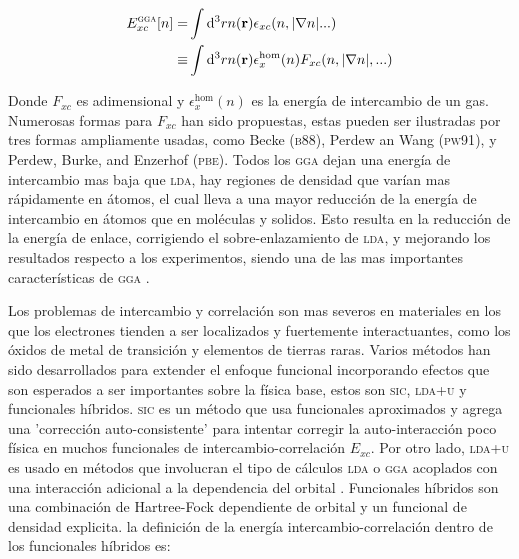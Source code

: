 \begin{equation}
    \begin{split}
        E_{xc}^{\textsc{gga}}[n]=&\int\mathrm{d}^{3}rn(\vec{r})\epsilon_{xc}(n,|\nabla n|...)\\
        \equiv&\int\mathrm{d}^{3}rn(\vec{r})\epsilon_{x}^\text{hom}(n)F_{xc}(n,|\nabla n|,...)
    \end{split}
\end{equation}

Donde $F_{xc}$ es adimensional y $\epsilon_{x}^{\text{hom}}(n)$ es la energía de intercambio de un gas. Numerosas formas para $F_{xc}$ han sido propuestas, estas pueden ser ilustradas por tres formas ampliamente usadas, como Becke (\textsc{b88})\cite{Becke1988Density-functionalBehavior}, Perdew an Wang (\textsc{pw91})\cite{Perdew1992AccurateEnergy}, y Perdew, Burke, and Enzerhof (\textsc{pbe})\cite{Perdew1996GeneralizedSimple}. Todos los \textsc{gga} dejan una energía de intercambio mas baja que \textsc{lda}, hay regiones de densidad que varían mas rápidamente en átomos, el cual lleva a una mayor reducción de la energía de intercambio en átomos que en moléculas y solidos. Esto resulta en la reducción de la energía de enlace, corrigiendo el sobre-enlazamiento de \textsc{lda}, y mejorando los resultados respecto a los experimentos, siendo una de las mas importantes características de \textsc{gga} \cite{martin_2004}.%

Los  problemas de intercambio y correlación son mas severos en materiales en los que los electrones tienden a ser localizados y fuertemente interactuantes, como los óxidos de metal de transición y elementos de tierras raras. Varios métodos han sido desarrollados para extender el enfoque funcional incorporando efectos que son esperados a ser importantes sobre la física base, estos son \textsc{sic}, \textsc{lda+u} y funcionales híbridos. \textsc{sic} es un método que usa funcionales aproximados y agrega una 'corrección auto-consistente' para intentar corregir la auto-interacción poco física en muchos funcionales de intercambio-correlación $E_{xc}$. Por otro lado, \textsc{lda+u} es usado en métodos que involucran el tipo de cálculos \textsc{lda} o \textsc{gga} acoplados con una interacción adicional a la dependencia del orbital \cite{Anisimov1997First-principlesMethod}. Funcionales híbridos son una combinación de Hartree-Fock dependiente de orbital y un funcional de densidad explicita. la definición de la energía intercambio-correlación dentro de los funcionales híbridos es:

